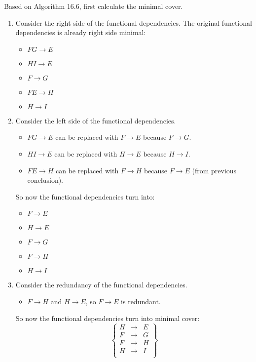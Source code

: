 \documentclass[11pt,letterpaper,titlepage,en-US]{article}
\begin{document}
\begin{homeworkProblem}
Based on Algorithm 16.6, first calculate the minimal cover.
    \begin{enumerate}[label=\textbf{Step {\arabic*}}, leftmargin=2cm]
        \item Consider the right side of the functional dependencies.
            The original functional dependencies is already right side minimal:
            \begin{itemize}
                \item $FG \rightarrow E$
                \item $HI \rightarrow E$
                \item $F \rightarrow G$
                \item $FE \rightarrow H$
                \item $H \rightarrow I$
            \end{itemize}
        \item Consider the left side of the functional dependencies.
            \begin{itemize}
                \item $FG \rightarrow E$ can be replaced with $F \rightarrow E$ because $F \rightarrow G$.
                \item $HI \rightarrow E$ can be replaced with $H \rightarrow E$ because $H \rightarrow I$.
                \item $FE \rightarrow H$ can be replaced with $F \rightarrow H$ because $F \rightarrow E$ (from previous conclusion).
            \end{itemize}
            So now the functional dependencies turn into:
            \begin{itemize}
                \item $F \rightarrow E$
                \item $H \rightarrow E$
                \item $F \rightarrow G$
                \item $F \rightarrow H$
                \item $H \rightarrow I$
            \end{itemize}
        \item Consider the redundancy of the functional dependencies.
            \begin{itemize}
                \item $F \rightarrow H$ and $H \rightarrow E$, so $F \rightarrow E$ is redundant.
            \end{itemize}
            So now the functional dependencies turn into minimal cover:
            \[\left\{
                    \begin{array}{rcl}
                        H &\rightarrow& E \\
                        F &\rightarrow& G \\
                        F &\rightarrow& H \\
                        H &\rightarrow& I \\
                    \end{array}
            \right\}\]


\end{enumerate}
\end{homeworkProblem}
\end{document}
